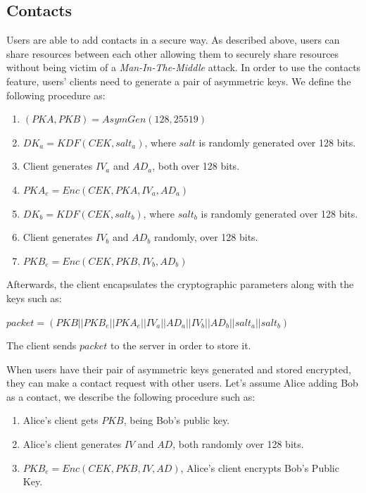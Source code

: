 \documentclass[a4paper,9pt,twoside]{article}
\begin{document}
\subsection{Contacts}

Users are able to add contacts in a secure way. As described above, users can share resources 
between each other allowing them to securely share resources without being victim of a 
\emph{Man-In-The-Middle} attack. In order to use the contacts feature, users' clients need to 
generate a pair of asymmetric keys. We define the following procedure as:

\begin{enumerate}
\itemsep0em
\item $(PKA,PKB)=AsymGen(128, 25519)$
\item $DK_a=KDF(CEK, salt_a)$, where $salt$ is randomly generated over 128 bits.
\item Client generates $IV_a$ and $AD_a$, both over 128 bits.
\item $PKA_e=Enc(CEK, PKA, IV_a, AD_a)$
\item $DK_b=KDF(CEK, salt_b)$, where $salt_b$ is randomly generated over 128 bits.
\item Client generates $IV_b$ and $AD_b$ randomly, over 128 bits.
\item $PKB_e=Enc(CEK, PKB, IV_b, AD_b)$
\end{enumerate}

Afterwards, the client encapsulates the cryptographic parameters along with the keys such as: 
\begin{center}
$packet=(PKB||PKB_e||PKA_e||IV_a||AD_a||IV_b||AD_b||salt_a||salt_b)$ 
\end{center}

The client sends $packet$ to the server in order to store it.

When users have their pair of asymmetric keys generated and stored encrypted, 
they can make a contact request with other users. Let's assume Alice adding Bob as a contact,
 we describe the following procedure such as:

\begin{enumerate}
\itemsep0em
\item Alice's client gets $PKB$, being Bob's public key.
\item Alice's client generates $IV$ and $AD$, both randomly over 128 bits.
\item $PKB_e=Enc(CEK, PKB, IV, AD)$, Alice's client encrypts Bob's Public Key.
\end{enumerate}
\end{document}
